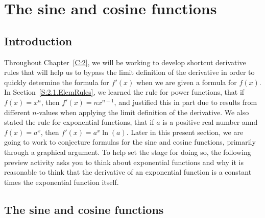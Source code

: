 \section{The sine and cosine functions} \label{S:2.2.SinCos}

\vspace*{-14 pt}

\subsection*{Introduction}

Throughout Chapter~\ref{C:2}, we will be working to develop shortcut derivative rules that will help us to bypass the limit definition of the derivative in order to quickly determine the formula for $f'(x)$ when we are given a formula for $f(x)$.  In Section~\ref{S:2.1.ElemRules}, we learned the rule for power functions, that if $f(x) = x^n$, then $f'(x) = nx^{n-1}$, and justified this in part due to results from different $n$-values when applying the limit definition of the derivative.  We also stated the rule for exponential functions, that if $a$ is a positive real number annd $f(x) = a^x$, then $f'(x) = a^x \ln(a)$.  Later in this present section, we are going to work to conjecture formulas for the sine and cosine functions, primarily through a graphical argument.  To help set the stage for doing so, the following preview activity asks you to think about exponential functions and why it is reasonable to think that the derivative of an exponential function is a constant times the exponential function itself.



\subsection*{The sine and cosine functions}

